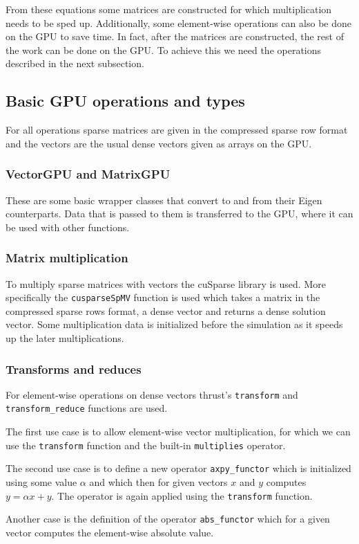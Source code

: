 \documentclass{article}
\begin{document}
From these equations some matrices are constructed for which multiplication needs to be 
sped up. Additionally, some element-wise operations can also be done on the GPU to save time.
In fact, after the matrices are constructed, the rest of the work can be done on the GPU.
To achieve this we need the operations described in the next subsection.
\subsection{Basic GPU operations and types}
For all operations sparse matrices are given in the compressed sparse row format and the vectors
are the usual dense vectors given as arrays on the GPU.
\subsubsection{VectorGPU and MatrixGPU}
These are some basic wrapper classes that convert to and from their Eigen counterparts.
Data that is passed to them is transferred to the GPU, where it can be used with other functions.
\subsubsection{Matrix multiplication}
To multiply sparse matrices with vectors the cuSparse library is used. More specifically the 
\verb|cusparseSpMV| function is used which takes a matrix in the compressed sparse rows format, 
a dense vector and returns a dense solution vector. Some multiplication data is initialized 
before the simulation as it speeds up the later multiplications. 
\subsubsection{Transforms and reduces}
For element-wise operations on dense vectors thrust's \verb|transform| and \verb|transform_reduce| 
functions are used.

The first use case is to allow element-wise vector multiplication, for which we can use 
the \verb|transform| function and the built-in \verb|multiplies| operator.

The second use case is to define a new operator \verb|axpy_functor| which is initialized using some 
value \(\alpha\) and which then for given vectors \(x\) and \(y\) computes \(y = \alpha x + y\).
The operator is again applied using the \verb|transform| function.

Another case is the definition of the operator \verb|abs_functor| which for a given vector 
computes the element-wise absolute value.
\end{document}
